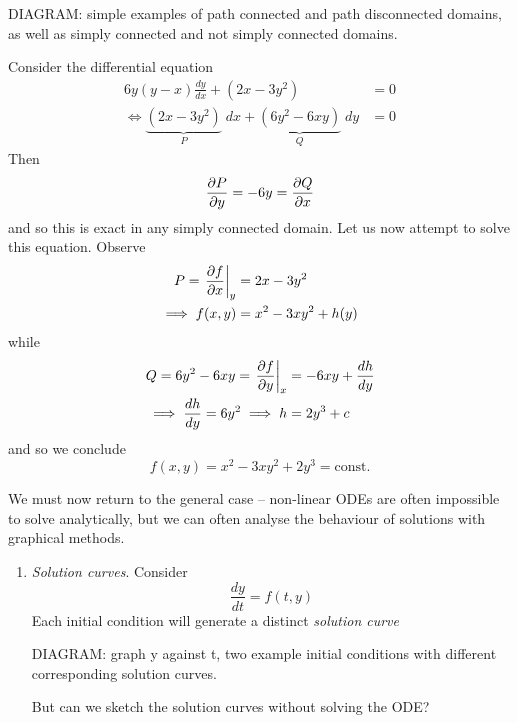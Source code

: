 \documentclass{../../template/note}
\begin{document}
    DIAGRAM: simple examples of path connected and path disconnected domains, as well as simply connected and not simply connected domains.
    
    \begin{example}
        Consider the differential equation
        \begin{align*}
            6y(y-x) \frac{dy}{dx} + (2x-3y^2) &= 0 \\
            \iff \underbrace{(2x-3y^2)}_{P} \; dx + \underbrace{(6y^2 - 6xy)}_{Q} \; dy &= 0
        \end{align*}
        Then
        \[
            \pd{P}{y} = -6y = \pd{Q}{x}
        \]
        and so this is exact in any simply connected domain. Let us now attempt to solve this equation. Observe
        \begin{align*}
            P = \pd[y]{f}{x} &= 2x - 3y^2 \\
            \implies f(x,y) &= x^2 - 3xy^2 + h(y)
        \end{align*}
        while
        \begin{align*}
            Q = 6y^2 - 6xy = \pd[x]{f}{y} &= -6xy + \frac{dh}{dy} \\
            \implies \frac{dh}{dy} = 6y^2 \implies h &= 2y^3 + c
        \end{align*}
        and so we conclude
        \[
            f(x, y) = x^2 - 3xy^2 + 2y^3 = \text{const.}
        \]        
    \end{example}
    
    We must now return to the general case -- non-linear ODEs are often impossible to solve analytically, but we can often analyse the behaviour of solutions with graphical methods.

    \begin{enumerate}
        \item \emph{Solution curves}. Consider
        \[
            \frac{dy}{dt} = f(t, y)
        \]
        Each initial condition will generate a distinct \emph{solution curve}

        DIAGRAM: graph y against t, two example initial conditions with different corresponding solution curves.

        But can we sketch the solution curves without solving the ODE?
    \end{enumerate}
    
\end{document}

